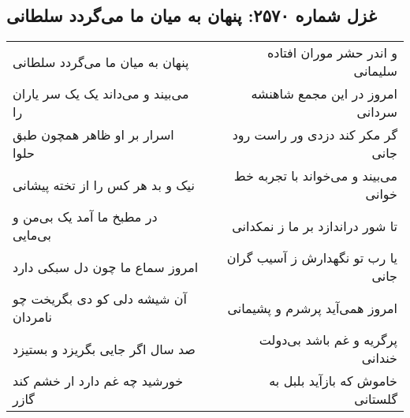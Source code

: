 \begin{center}
\section*{غزل شماره ۲۵۷۰: پنهان به میان ما می‌گردد سلطانی}
\label{sec:2570}
\begin{longtable}{l p{0.5cm} r}
پنهان به میان ما می‌گردد سلطانی
&&
و اندر حشر موران افتاده سلیمانی
\\
می‌بیند و می‌داند یک یک سر یاران را
&&
امروز در این مجمع شاهنشه سردانی
\\
اسرار بر او ظاهر همچون طبق حلوا
&&
گر مکر کند دزدی ور راست رود جانی
\\
نیک و بد هر کس را از تخته پیشانی
&&
می‌بیند و می‌خواند با تجربه خط خوانی
\\
در مطبخ ما آمد یک بی‌من و بی‌مایی
&&
تا شور دراندازد بر ما ز نمکدانی
\\
امروز سماع ما چون دل سبکی دارد
&&
یا رب تو نگهدارش ز آسیب گران جانی
\\
آن شیشه دلی کو دی بگریخت چو نامردان
&&
امروز همی‌آید پرشرم و پشیمانی
\\
صد سال اگر جایی بگریزد و بستیزد
&&
پرگریه و غم باشد بی‌دولت خندانی
\\
خورشید چه غم دارد ار خشم کند گازر
&&
خاموش که بازآید بلبل به گلستانی
\\
\end{longtable}
\end{center}
